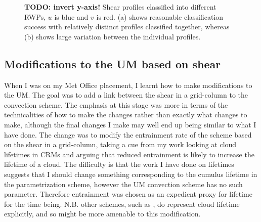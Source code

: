\documentclass[11pt,a4paper]{article}
\newcommand\todo[1]{\textbf{TODO: #1}}
\begin{document}
\begin{figure}[htp!]%
    \centering
    \qquad
    \caption{\todo{invert y-axis!} Shear profiles classified into different RWPs, $u$ is blue and $v$ is red. (a) shows reasonable classification success with relatively distinct profiles classified together, whereas (b) shows large variation between the individual profiles.}%
    \label{fig:shear_profiles}%
\end{figure}


\subsection{Modifications to the UM based on shear}
\label{sec:um_mod}

When I was on my Met Office placement, I learnt how to make modifications to the UM. The goal was to add a link between the shear in a grid-column to the convection scheme. The emphasis at this stage was more in terms of the technicalities of how to make the changes rather than exactly what changes to make, although the final changes I make may well end up being similar to what I have done. The change was to modify the entrainment rate of the scheme based on the shear in a grid-column, taking a cue from my work looking at cloud lifetimes in CRMs and arguing that reduced entrainment is likely to increase the lifetime of a cloud. The difficulty is that the work I have done on lifetimes suggests that I should change something corresponding to the cumulus lifetime in the parametrization scheme, however the UM convection scheme \parencite{gregory1990mass} has no such parameter. Therefore entrainment was chosen as an expedient proxy for lifetime for the time being. N.B. other schemes, such as \cite{plant2008stochastic}, do represent cloud lifetime explicitly, and so might be more amenable to this modification. 
\end{document}
